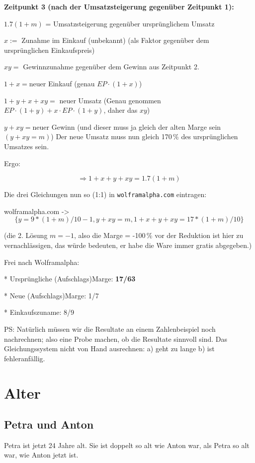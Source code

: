{\textbf{Zeitpunkt 3 (nach der Umsatzsteigerung gegenüber Zeitpunkt 1):}

$1.7(1+m)$ = Umsatzsteigerung gegenüber ursprünglichem Umsatz


$x :=$ Zunahme im Einkauf (unbekannt) (als Faktor gegenüber dem ursprünglichen Einkaufspreis)

$xy =$ Gewinnzunahme gegenüber dem Gewinn aus Zeitpunkt 2.

$1+x = $neuer Einkauf (genau $EP \cdot{} (1+x)$)

$1+y + x + xy =$ neuer Umsatz (Genau genommen $EP \cdot{} (1+y) + x\cdot{}EP \cdot{}(1+y)$,
daher das $xy$)

$y+xy = $neuer Gewinn (und dieser muss ja gleich der alten Marge sein $(y+xy=m)$)
Der neue Umsatz muss nun gleich 170\,\% des ursprünglichen Umsatzes sein.

Ergo:

$$\Longrightarrow 1+x+y+xy = 1.7(1+m)$$

Die drei Gleichungen nun so (1:1) in \texttt{wolframalpha.com} eintragen:

wolframalpha.com -> $$\{ y=9*(1+m)/10-1, y+xy=m, 1+x+y+xy=17*(1+m)/10\}$$

(die 2. Lösung $m=-1$, also die Marge = -100\,\% vor der Reduktion ist hier zu
vernachlässigen, das würde bedeuten, er habe die Ware immer gratis
abgegeben.)

Frei nach Wolframalpha:

* Ursprüngliche (Aufschlags)Marge: \textbf{17/63}

* Neue (Aufschlags)Marge: 1/7

* Einkaufszuname: 8/9

PS: Natürlich müssen wir die Resultate an einem Zahlenbeispiel noch
nachrechnen; also eine Probe machen, ob die Resultate sinnvoll sind.
Das Gleichungssystem nicht von Hand ausrechnen: a) geht zu lange b) ist
fehleranfällig.
\newpage
}%


\section{Alter}
\subsection{Petra und Anton}

Petra ist jetzt 24 Jahre alt. Sie ist doppelt so alt wie Anton war, als Petra so alt
war, wie Anton jetzt ist.

